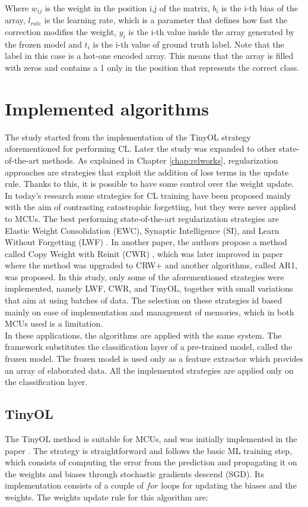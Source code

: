 \documentclass[12pt]{report}
\begin{document}
Where $w_{ij}$ is the weight in the position i,j of the matrix, $b_i$ is the i-th bias of the array, $l_{rate}$ is the learning rate, which is a parameter that defines how fast the correction modifies the weight, $y_i$ is the i-th value inside the array generated by the frozen model and $t_i$ is the i-th value of ground truth label. Note that the label in this case is a hot-one encoded array. This means that the array is filled with zeros and contains a 1 only in the position that represents the correct class.

\section{Implemented algorithms}
\label{algorithms}
The study started from the implementation of the TinyOL strategy aforementioned for performing CL. Later the study was expanded to other state-of-the-art methods. As explained in Chapter \ref{chap:relworks}, regularization approaches are strategies that exploit the addition of loss terms in the update rule. Thanks to this, it is possible to have some control over the weight update. In today's research some strategies for CL training have been proposed mainly with the aim of contrasting catastrophic forgetting, but they were never applied to MCUs. The best performing state-of-the-art regularization strategies are Elastic Weight Consolidation (EWC), Synaptic Intelligence (SI), and Learn Without Forgetting (LWF) \cite{li2017learning}. In another paper, the authors propose a method called Copy Weight with Reinit (CWR) \cite{lomonaco2017core50}, which was later improved in paper \cite{maltoni2019continuous} where the method was upgraded to CRW+ and another algorithms, called AR1, was proposed. In this study, only some of the aforementioned strategies were implemented, namely LWF, CWR, and TinyOL, together with small variations that aim at using batches of data. The selection on these strategies id based mainly on ease of implementation and management of memories, which in both MCUs used is a limitation.\\
In these applications, the algorithms are applied with the same system. The framework substitutes the classification layer of a pre-trained model, called the frozen model. The frozen model is used only as a feature extractor which provides an array of elaborated data. All the implemented strategies are applied only on the classification layer.

\subsection{TinyOL}
The TinyOL method is suitable for MCUs, and was initially implemented in the paper \cite{ren2021tinyol}. The strategy is straightforward and follows the basic ML training step, which consists of computing the error from the prediction and propagating it on the weights and biases through stochastic gradients descend (SGD). Its implementation consists of a couple of $for$ loops for updating the biases and the weights. The weights update rule for this algorithm are:
\end{document}
